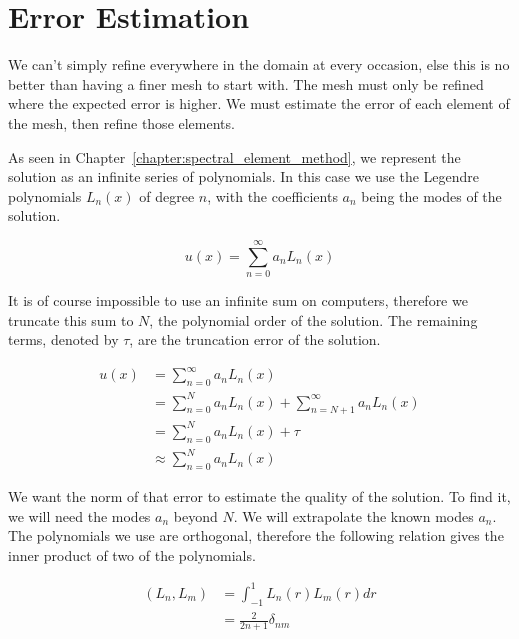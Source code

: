 \section{Error Estimation} \label{section:adaptive_mesh_refinement:error_estimation}

We can't simply refine everywhere in the domain at every occasion, else this is no better than
having a finer mesh to start with. The mesh must only be refined where the expected error is higher.
We must estimate the error of each element of the mesh, then refine those elements.

As seen in Chapter~\ref{chapter:spectral_element_method}, we represent the solution as an infinite
series of polynomials. In this case we use the Legendre polynomials $L_n(x)$ of degree $n$, with the
coefficients $a_n$ being the modes of the solution.

\begin{equation} \label{equ:infinite_sum}
	u(x) = \sum_{n = 0}^{\infty}a_n L_n(x)
\end{equation}

It is of course impossible to use an infinite sum on computers, therefore we truncate this sum to
$N$, the polynomial order of the solution. The remaining terms, denoted by $\tau$, are the
truncation error of the solution.

\begin{equation} \label{equ:solution_approximation}
	\begin{aligned}
		u(x) &= \sum_{n = 0}^{\infty }a_n L_n(x) \\
		&= \sum_{n = 0}^{N}a_n L_n(x) + \sum_{n = N + 1}^{\infty }a_n L_n(x) \\ 
		&= \sum_{n = 0}^{N}a_n L_n(x) + \tau \\
		&\approx \sum_{n = 0}^{N}a_n L_n(x)
	\end{aligned}
\end{equation}

We want the norm of that error to estimate the quality of the solution. To find it, we will need
the modes $a_n$ beyond $N$. We will extrapolate the known modes $a_n$. The polynomials we use are
orthogonal, therefore the following relation gives the inner product of two of the polynomials.

\begin{equation} \label{equ:polynomial_orthogonality}
	\begin{aligned}
		\left ( L_n, L_m \right ) &= \int_{-1}^{1}L_n(r)L_m(r)dr \\
		&= \frac{2}{2n + 1}\delta _{nm}
	\end{aligned}
\end{equation}

